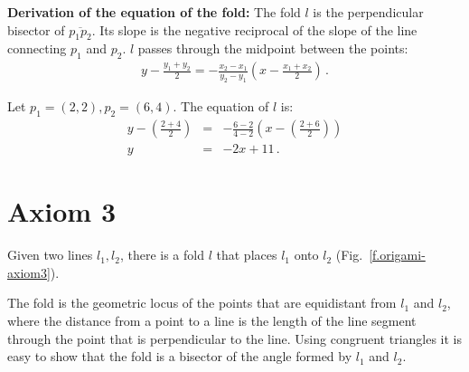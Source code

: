 \noindent\textbf{Derivation of the equation of the fold:}
The fold $l$ is the perpendicular bisector of $\overline{p_1p_2}$. Its slope is the negative reciprocal of the slope of the line connecting $p_1$ and $p_2$. $l$ passes through the midpoint between the points:
\begin{align}
y - \frac{y_1+y_2}{2} = -\frac{x_2-x_1}{y_2-y_1}\left(x-\frac{x_1+x_2}{2}\right)\,.\label{eq.midpoint1}
\end{align}

\begin{example}
Let $p_1=(2,2), p_2=(6,4)$. The equation of $l$ is:
%
\begin{eqnarray*}
y-\left(\frac{2+4}{2}\right)&=&-\frac{6-2}{4-2}\left(x-\left(\frac{2+6}{2}\right)\right)\\
y&=&-2x+11\,.
\end{eqnarray*}
\end{example}



\section{Axiom 3}\label{s.ax3}

\begin{axiom}
Given two lines $l_1,l_2$, there is a fold $l$ that places $l_1$ onto $l_2$ (Fig.~\ref{f.origami-axiom3}).
\end{axiom}

The fold is the geometric locus of the points that are equidistant from $l_1$ and $l_2$, where the distance from a point to a line is the length of the line segment through the point that is perpendicular to the line. Using congruent triangles it is easy to show that the fold is a bisector of the angle formed by $l_1$ and $l_2$.


